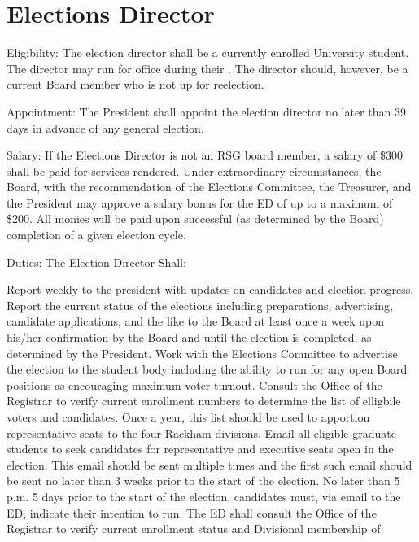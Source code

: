 \section{Elections Director}
\begin{enumsubsection}
\item{Eligibility:} The election director shall be a currently enrolled
University student. The director may run for office during their . The
director should, however, be a current Board member who is not up for
reelection.
\item{Appointment:} The President shall appoint the election director no later
than 39 days in advance of any general election.
\item{Salary:} If the Elections Director is not an RSG board member, a salary
of \$300 shall be paid for services rendered. Under extraordinary
circumstances, the Board, with the recommendation of the Elections
Committee, the Treasurer, and the President may approve a salary bonus
for the ED of up to a maximum of \$200. All monies will be paid upon
successful (as determined by the Board) completion of a given election
cycle.
\item{Duties:} The Election Director Shall:
\begin{enumsubsubsection}
\itemnotoc Report weekly to the president with updates on candidates and
election progress.
\itemnotoc Report the current status of the elections including preparations,
advertising, candidate applications, and the like to the Board at
least once a week upon his/her confirmation by the Board and
until the election is completed, as determined by the President.
\itemnotoc Work with the Elections Committee to advertise the election to
the student body including the ability to run for any open Board
positions as encouraging maximum voter turnout.
\itemnotoc Consult the Office of the Registrar to verify current enrollment
numbers to determine the list of elligbile voters and candidates.
Once a year, this list should be used to apportion representative
seats to the four Rackham divisions.
\itemnotoc Email all eligible graduate students to seek candidates for
representative and executive seats open in the election. This
email should be sent multiple times and the first such email
should be sent no later than 3 weeks prior to the start of the
election.
\itemnotoc No later than 5 p.m. 5 days prior to the start of the election,
candidates must, via email to the ED, indicate their intention to
run. The ED shall consult the Office of the Registrar to verify
current enrollment status and Divisional membership of

\end{enumsubsubsection}
\end{enumsubsection}
